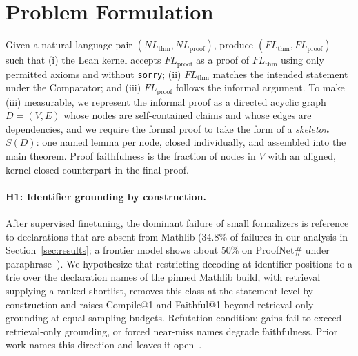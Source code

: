 \documentclass[sigconf,anonymous]{aamas}
\begin{document}
\section{Problem Formulation}
{\color{red}Given a natural-language pair $(NL_{\text{thm}}, NL_{\text{proof}})$, produce
$(FL_{\text{thm}}, FL_{\text{proof}})$ such that (i) the Lean kernel accepts
$FL_{\text{proof}}$ as a proof of $FL_{\text{thm}}$ using only permitted axioms
and without \texttt{sorry}; (ii) $FL_{\text{thm}}$ matches the intended
statement under the Comparator; and (iii) $FL_{\text{proof}}$ follows the
informal argument. To make (iii) measurable, we represent the informal proof as
a directed acyclic graph $D=(V,E)$ whose nodes are self-contained claims and
whose edges are dependencies, and we require the formal proof to take the form
of a \emph{skeleton} $S(D)$: one named lemma per node, closed individually, and
assembled into the main theorem. Proof faithfulness is the fraction of nodes in
$V$ with an aligned, kernel-closed counterpart in the final proof.

\paragraph{H1: Identifier grounding by construction.} After supervised
finetuning, the dominant failure of small formalizers is reference to
declarations that are absent from Mathlib (34.8\% of failures in our analysis in
Section~\ref{sec:results}; a frontier model shows about 50\% on ProofNet\# under
paraphrase~\citep{surfacesens2026}). We hypothesize that restricting decoding at
identifier positions to a trie over the declaration names of the pinned Mathlib
build, with retrieval supplying a ranked shortlist, removes this class at the
statement level by construction and raises Compile@1 and Faithful@1 beyond
retrieval-only grounding at equal sampling budgets. Refutation condition: gains
fail to exceed retrieval-only grounding, or forced near-miss names degrade
faithfulness. Prior work names this direction and leaves it
open~\citep{surfacesens2026}.

}
\end{document}
